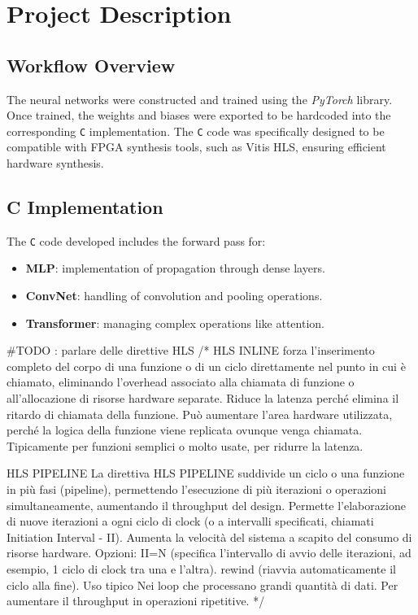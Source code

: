 \documentclass{article}
\begin{document}
\section{Project Description}
\subsection{Workflow Overview}
The neural networks were constructed and trained using the \textit{PyTorch} library. Once trained, the weights and biases were exported to be hardcoded into the corresponding \texttt{C} implementation. The \texttt{C} code was specifically designed to be compatible with FPGA synthesis tools, such as Vitis HLS, ensuring efficient hardware synthesis.


\subsection{C Implementation}
The \texttt{C} code developed includes the forward pass for:
\begin{itemize}
    \item \textbf{MLP}: implementation of propagation through dense layers.
    \item \textbf{ConvNet}: handling of convolution and pooling operations.
    \item \textbf{Transformer}: managing complex operations like attention.
\end{itemize}

\#TODO : parlare delle direttive HLS
/*
HLS INLINE
forza l'inserimento completo del corpo di una funzione o di un ciclo direttamente nel punto in cui è chiamato, eliminando l'overhead associato alla chiamata di funzione o all'allocazione di risorse hardware separate.
Riduce la latenza perché elimina il ritardo di chiamata della funzione. Può aumentare l'area hardware utilizzata, perché la logica della funzione viene replicata ovunque venga chiamata.
Tipicamente per funzioni semplici o molto usate, per ridurre la latenza.

HLS PIPELINE
La direttiva HLS PIPELINE suddivide un ciclo o una funzione in più fasi (pipeline), permettendo l'esecuzione di più iterazioni o operazioni simultaneamente, aumentando il throughput del design.
Permette l'elaborazione di nuove iterazioni a ogni ciclo di clock (o a intervalli specificati, chiamati Initiation Interval - II).
Aumenta la velocità del sistema a scapito del consumo di risorse hardware.
Opzioni:
II=N (specifica l'intervallo di avvio delle iterazioni, ad esempio, 1 ciclo di clock tra una e l'altra).
rewind (riavvia automaticamente il ciclo alla fine).
Uso tipico
Nei loop che processano grandi quantità di dati.
Per aumentare il throughput in operazioni ripetitive.
*/
\end{document}
